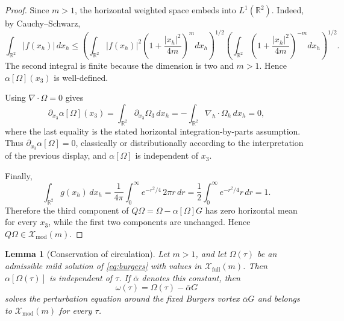 \documentclass[11pt]{amsart}
\theoremstyle{plain}
\newtheorem{lemma}[theorem]{Lemma}
\theoremstyle{definition}
\theoremstyle{remark}
\numberwithin{equation}{section}
\begin{document}
\begin{proof}
Since \(m>1\), the horizontal weighted space embeds into
\(L^1(\mathbb R^2)\).  Indeed, by Cauchy--Schwarz,
\[
   \int_{\mathbb R^2}|f(x_h)|\,dx_h
   \le
   \left(\int_{\mathbb R^2}|f(x_h)|^2
      \left(1+\frac{|x_h|^2}{4m}\right)^m dx_h\right)^{1/2}
   \left(\int_{\mathbb R^2}
      \left(1+\frac{|x_h|^2}{4m}\right)^{-m}dx_h\right)^{1/2}.
\]
The second integral is finite because the dimension is two and \(m>1\).  Hence
\(\alpha[\Omega](x_3)\) is well-defined.

Using \(\nabla\cdot\Omega=0\) gives
\[
   \partial_{x_3}\alpha[\Omega](x_3)
   =
   \int_{\mathbb R^2}\partial_{x_3}\Omega_3\,dx_h
   =
   -\int_{\mathbb R^2}\nabla_h\cdot\Omega_h\,dx_h
   =
   0,
\]
where the last equality is the stated horizontal integration-by-parts
assumption.  Thus \(\partial_{x_3}\alpha[\Omega]=0\), classically or
distributionally according to the interpretation of the previous display, and
\(\alpha[\Omega]\) is independent of \(x_3\).

Finally,
\[
   \int_{\mathbb R^2}g(x_h)\,dx_h
   =
   \frac1{4\pi}\int_0^\infty e^{-r^2/4}\,2\pi r\,dr
   =
   \frac12\int_0^\infty e^{-r^2/4}r\,dr
   =
   1 .
\]
Therefore the third component of \(Q\Omega=\Omega-\alpha[\Omega]G\) has zero
horizontal mean for every \(x_3\), while the first two components are
unchanged.  Hence \(Q\Omega\in\mathcal X_{\mathrm{mod}}(m)\).
\end{proof}

\begin{lemma}[Conservation of circulation]\label{lem:circulation-conserved}
Let \(m>1\), and let \(\Omega(\tau)\) be an admissible mild solution of
\eqref{eq:burgers} with values in \(\mathcal X_{\mathrm{full}}(m)\).  Then
\(\alpha[\Omega(\tau)]\) is independent of \(\tau\).  If
\(\bar\alpha\) denotes this constant, then
\[
   \omega(\tau)=\Omega(\tau)-\bar\alpha G
\]
solves the perturbation equation around the fixed Burgers vortex
\(\bar\alpha G\) and belongs to \(\mathcal X_{\mathrm{mod}}(m)\) for every
\(\tau\).
\end{lemma}
\end{document}
